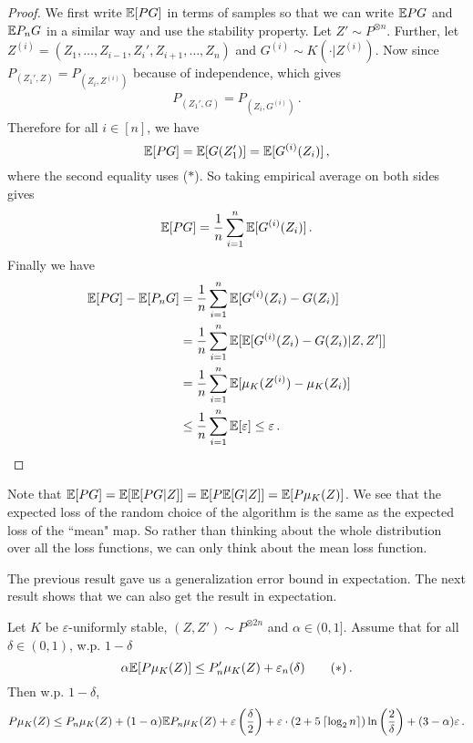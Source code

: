 \documentclass[twoside]{article}
\begin{document}
\begin{proof}
    We first write $\mathbb{E}[PG]$ in terms of samples so that we can write $\mathbb{E}{PG}$ and $\mathbb{E}{P_nG}$ in a similar way and use the stability property. Let $Z' \sim P^{\otimes n}$. Further, let $Z^{(i)} = (Z_1, \dots, Z_{i-1}, Z_i', Z_{i+1}, \dots, Z_n)$ and $G^{(i)} \sim K(\cdot | Z^{(i)})$. Now since $P_{(Z_1', Z)} = P_{(Z_i, Z^{(i)})}$ because of independence, which gives
    \begin{align*}
         P_{(Z_1', G)} = P_{(Z_i, G^{(i)})} \tag{$\ast$}\,.
    \end{align*}
    Therefore for all $i \in [n]$, we have 
    \[
        \mathbb{E}[PG] = \mathbb{E}[G(Z_1')] = \mathbb{E}[G^{(i)}(Z_i)] \,,
    \]
    where the second equality uses ($\ast$). So taking empirical average on both sides gives
    \[
        \mathbb{E}[PG] = \frac1n \sum_{i=1}^n \mathbb{E}[G^{(i)}(Z_i)] \,.
    \]
    Finally we have
    \begin{align*}
        \mathbb{E}[PG] - \mathbb{E}[P_n G] &= \frac1n \sum_{i=1}^n \mathbb{E}[G^{(i)}(Z_i) - G(Z_i)] \\
        &= \frac1n \sum_{i=1}^n \mathbb{E}[\mathbb{E}[G^{(i)}(Z_i) - G(Z_i)| Z, Z']] \\
        &= \frac1n \sum_{i=1}^n \mathbb{E}[\mu_K(Z^{(i)}) - \mu_K(Z_i)] \\
        &\le \frac1n \sum_{i=1}^n \mathbb{E}[\varepsilon] \le \varepsilon \,.
    \end{align*}
\end{proof}


\begin{remark}
    Note that $\mathbb{E}[PG] = \mathbb{E}[\mathbb{E}[PG|Z]] = \mathbb{E}[P\mathbb{E}[G|Z]] = \mathbb{E}[P \mu_K(Z)]$. We see that the expected loss of the random choice of the algorithm is the same as the expected loss of the ``mean" map. So rather than thinking about the whole distribution over all the loss functions, we can only think about the mean loss function.
\end{remark}
The previous result gave us a generalization error bound in expectation. The next result shows that we can also get the result in expectation.

\begin{theorem}\label{thm:hp-stable}
    Let $K$ be $\varepsilon$-uniformly stable, $(Z, Z') \sim P^{\otimes 2n}$ and $\alpha \in (0, 1]$. Assume that for all $\delta \in (0,1)$, w.p. $1-\delta$
    \[
        \alpha \mathbb{E}[P\mu_K(Z)] \le P_n'\mu_K(Z) + \varepsilon_n(\delta) \tag{$\ast$}\,.
    \]
    Then w.p. $1-\delta$,
    \begin{align*}
        P \mu_K(Z) \le P_n \mu_K(Z) + (1-\alpha)\mathbb{E} P_n\mu_K(Z) + \varepsilon\left( \frac\delta2 \right) + \varepsilon \cdot (2+5\left\lceil {\log_2 n} \right\rceil)\ln\left( \frac2\delta \right) + (3-\alpha)\varepsilon \,.
    \end{align*}
\end{theorem}
\end{document}
